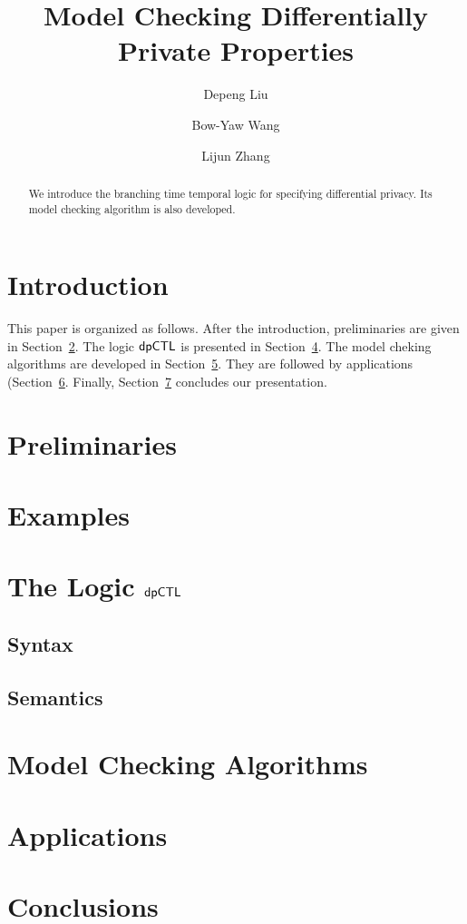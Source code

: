 \documentclass{llncs}
\title{Model Checking Differentially Private Properties}
\author{
Depeng Liu\inst{1}
\and
Bow-Yaw Wang\inst{2}
\and 
Lijun Zhang\inst{1}}
\institute{
Chinese Academy of Sciences 
\and
Academia Sinica
}
\begin{document}
\maketitle

\begin{abstract}
  We introduce the branching time temporal logic \dpCTL for specifying
  differential privacy. Its model checking algorithm is also developed. 
\end{abstract}

\section{Introduction}
\label{section:introduction}


This paper is organized as follows. After the introduction,
preliminaries are given in Section~\ref{section:preliminaries}. The
logic $\textsf{dpCTL}$ is presented in
Section~\ref{section:dpCTL}. The model cheking algorithms are developed in
Section~\ref{section:model-checking-algorithms}. They are followed by
applications (Section~\ref{section:applications}. Finally,
Section~\ref{section:conclusions} concludes our presentation.

\section{Preliminaries}
\label{section:preliminaries}


\section{Examples}
\label{section:examples}


\section{The Logic $\textsf{dpCTL}$}
\label{section:dpCTL}


\subsection{Syntax}
\label{subsection:syntax}


\subsection{Semantics}
\label{subsection:semantics}


\section{Model Checking Algorithms}
\label{section:model-checking-algorithms}


\section{Applications}
\label{section:applications}


\section{Conclusions}
\label{section:conclusions}




\end{document}
